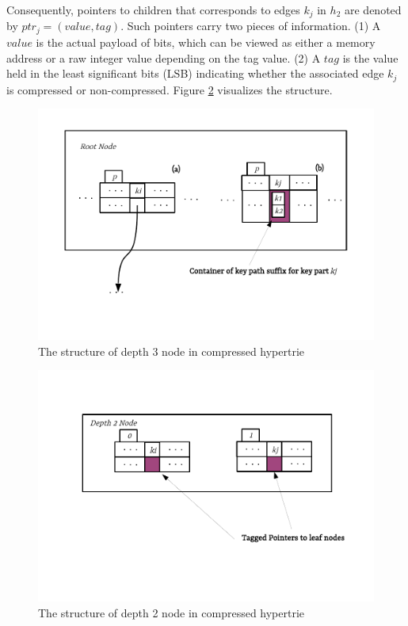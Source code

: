 Consequently, pointers to children that corresponds to edges $k_{j}$ in $h_2$ are denoted by $ptr_{j} = (value, tag)$. Such pointers carry two pieces of information. (1) A $value$ is the actual payload of bits, which can be viewed as either a memory address or a raw integer value depending on the tag value. (2) A $tag$ is the value held in the least significant bits (LSB) indicating whether the associated edge $k_{j}$ is compressed or non-compressed. Figure \ref{fig:compressed_depth_2_node} visualizes the structure.

\clearpage
\begin{figure}
	\centering
	\vspace{-0.3in}
	\includegraphics{figures/chapter4/depth3}
	\caption{The structure of depth 3 node in compressed hypertrie}
	\label{fig:compressed_depth_3_node}
\end{figure}

\begin{figure}
	\centering
	\vspace{-1in}
	\includegraphics{figures/chapter4/depth2}
	\caption{The structure of depth 2 node in compressed hypertrie}
	\label{fig:compressed_depth_2_node}
\end{figure}
\clearpage

